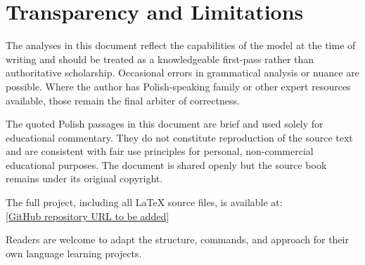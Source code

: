 \section*{Transparency and Limitations}

The analyses in this document reflect the capabilities of the model
at the time of writing and should be treated as a knowledgeable
first-pass rather than authoritative scholarship. Occasional errors
in grammatical analysis or nuance are possible. Where the author
has Polish-speaking family or other expert resources available,
those remain the final arbiter of correctness.

The quoted Polish passages in this document are brief and used
solely for educational commentary. They do not constitute
reproduction of the source text and are consistent with fair use
principles for personal, non-commercial educational purposes.
The document is shared openly but the source book remains under
its original copyright.

\vspace{1.5em}
\noindent The full project, including all \LaTeX{} source files,
is available at:\\
\href{https://github.com/}{[GitHub repository URL to be added]}

\vspace{0.5em}
\noindent Readers are welcome to adapt the structure, commands,
and approach for their own language learning projects.

